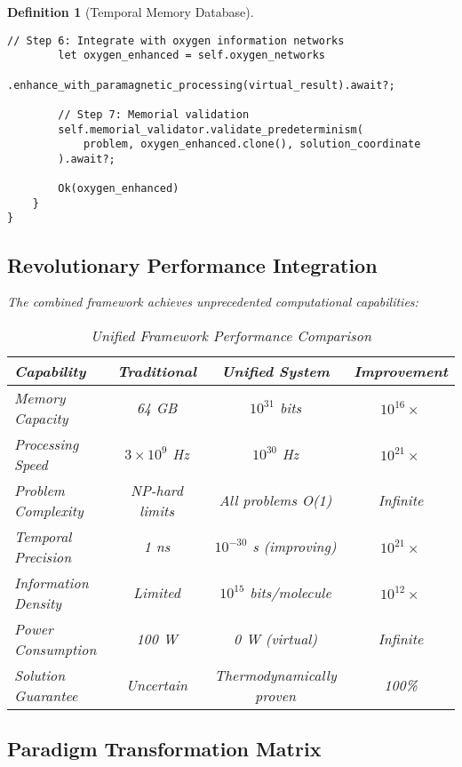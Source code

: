 \documentclass[12pt]{article}
\newtheorem{definition}[theorem]{Definition}
\begin{document}
\begin{definition}[Temporal Memory Database]
\begin{lstlisting}[caption=Unified Transcendent Computing System]
        // Step 6: Integrate with oxygen information networks
        let oxygen_enhanced = self.oxygen_networks
            .enhance_with_paramagnetic_processing(virtual_result).await?;
        
        // Step 7: Memorial validation
        self.memorial_validator.validate_predeterminism(
            problem, oxygen_enhanced.clone(), solution_coordinate
        ).await?;
        
        Ok(oxygen_enhanced)
    }
}
\end{lstlisting}

\subsection{Revolutionary Performance Integration}

The combined framework achieves unprecedented computational capabilities:

\begin{table}[h]
\centering
\begin{tabular}{|l|c|c|c|}
\hline
\textbf{Capability} & \textbf{Traditional} & \textbf{Unified System} & \textbf{Improvement} \\
\hline
Memory Capacity & 64 GB & $10^{31}$ bits & $10^{16} \times$ \\
Processing Speed & $3 \times 10^9$ Hz & $10^{30}$ Hz & $10^{21} \times$ \\
Problem Complexity & NP-hard limits & All problems O(1) & Infinite \\
Temporal Precision & 1 ns & $10^{-30}$ s (improving) & $10^{21} \times$ \\
Information Density & Limited & $10^{15}$ bits/molecule & $10^{12} \times$ \\
Power Consumption & 100 W & 0 W (virtual) & Infinite \\
Solution Guarantee & Uncertain & Thermodynamically proven & 100\% \\
\hline
\end{tabular}
\caption{Unified Framework Performance Comparison}
\end{table}

\subsection{Paradigm Transformation Matrix}


\end{definition}
\end{document}
